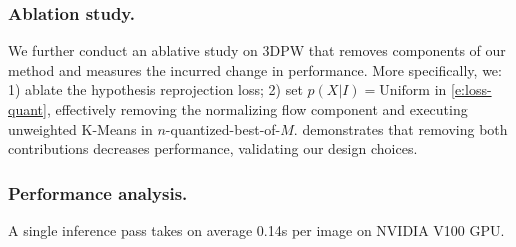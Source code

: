 

% 
% 

\subsubsection{Ablation study.}
We further conduct an ablative study on 3DPW that removes components of our method and measures the incurred change in performance. More specifically, we: 1) ablate the hypothesis reprojection loss; 2) set $p(X|I)=\text{Uniform}$ in \cref{e:loss-quant}, effectively removing the normalizing flow component and executing unweighted K-Means in $n$-quantized-best-of-$M$.  demonstrates that removing both contributions decreases performance, validating our design choices.

\subsubsection{Performance analysis.}
A single inference pass takes on average 0.14s per image on NVIDIA V100 GPU.




